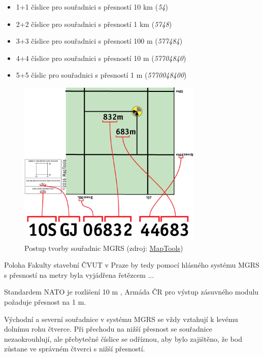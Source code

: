 \begin{itemize}
		\begin{itemize}
				\item 1+1 číslice pro souřadnici s přesností 10 km (\textit{54})
				\item 2+2 číslice pro souřadnici s přesností 1 km (\textit{5748})
				\item 3+3 číslice pro souřadnici s přesností 100 m (\textit{577484})
				\item 4+4 číslice pro souřadnici s přesností 10 m (\textit{57704840})
				\item 5+5 číslic pro souřadnici s přesností 1 m (\textit{5770048400})
		\end{itemize}	
		 
\end{itemize}

\begin{figure}[H]
    \centering
      \includegraphics[width=250pt]{./pictures/MGRS_tvorba.png}
      \caption[Postup tvorby souřadnic MGRS]{Postup tvorby souřadnic MGRS
      (zdroj: \href{https://www.maptools.com/tutorials/mgrs/quick_guide}{MapTools})}
      \label{fig:maptools}
\end{figure}
  
Poloha Fakulty stavební ČVUT v Praze by tedy pomocí hlásného systému
MGRS s přesností na metry byla vyjádřena řetězcem ...

Standardem NATO je rozlišení 10 m \cite{wiki}, Armáda ČR pro výstup
zásuvného modulu požaduje přesnost na 1 m.

Východní a severní souřadnice v systému MGRS se vždy vztahují k levému
dolnímu rohu čtverce. Při přechodu na nižší přesnost se souřadnice
nezaokrouhlují, ale přebytečné číslice se odříznou, aby bylo
zajištěno, že bod zůstane ve správném čtverci s nižší přesností.




